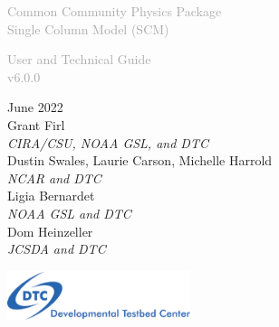 \begin{titlepage}
\renewcommand{\thefootnote}{\fnsymbol{footnote}}

\vspace*{1em}
\noindent

\begin{center}
\textcolor{darkgray}{\bigsf Common Community Physics Package\\[0.5ex] Single Column Model (SCM)}
\vspace*{1em}\par

\textcolor{darkgray}{\bigst User and Technical Guide\\[0.5ex] v6.0.0}
\vspace*{1em}\par

\large{June 2022}\\

Grant Firl\\
\textit{\small{CIRA/CSU, NOAA GSL, and DTC}}\\[4em]

Dustin Swales, Laurie Carson, Michelle Harrold\\
\textit{\small{NCAR and DTC}}\\[4em]

Ligia Bernardet\\
\textit{\small{NOAA GSL and DTC}}\\[4em]

Dom Heinzeller\\
\textit{\small{JCSDA and DTC}}\\[4em]

\vspace{4em}

\includegraphics[width=0.4\textwidth]{images/dtc_logo.png}\\[2em]

\end{center}
\end{titlepage}
\pagebreak{}
